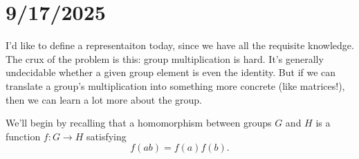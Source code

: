 \section{9/17/2025}

I'd like to define a representaiton today, since we have all the requisite knowledge.
The crux of the problem is this: group multiplication is hard.
It's generally undecidable whether a given group element is even the identity.
But if we can translate a group's multiplication into something more concrete (like matrices!),
then we can learn a lot more about the group.

We'll begin by recalling that a homomorphism between groups $G$ and $H$ 
is a function $f:G\to H$ satisfying \[ f(ab) = f(a)f(b). \]

